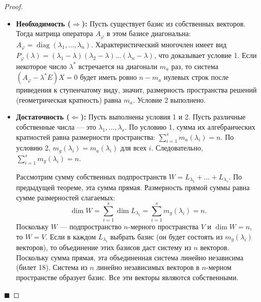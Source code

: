 \begin{proof}
\begin{itemize}
    \item \textbf{Необходимость ($\Rightarrow$):} Пусть существует базис из собственных векторов. Тогда матрица оператора $A_\varphi$ в этом базисе диагональна: $A_\varphi = \operatorname{diag}(\lambda_1, \dots, \lambda_n)$. 
    Характеристический многочлен имеет вид $P_\varphi(\lambda) = (\lambda_1 - \lambda)(\lambda_2 - \lambda)\dots(\lambda_n - \lambda)$, что доказывает условие 1. 
    Если некоторое число $\lambda^*$ встречается на диагонали $m_a$ раз, то система $(A_\varphi - \lambda^* E)X = 0$ будет иметь ровно $n - m_a$ нулевых строк после приведения к ступенчатому виду, значит, размерность пространства решений (геометрическая кратность) равна $m_a$. Условие 2 выполнено.
    
    \item \textbf{Достаточность ($\Leftarrow$):} Пусть выполнены условия 1 и 2. Пусть различные собственные числа --- это $\lambda_1, \dots, \lambda_s$. 
    По условию 1, сумма их алгебраических кратностей равна размерности пространства: $\sum_{i=1}^s m_a(\lambda_i) = n$.
    По условию 2, $m_g(\lambda_i) = m_a(\lambda_i)$ для всех $i$. Следовательно, $\sum_{i=1}^s m_g(\lambda_i) = n$.
    
    Рассмотрим сумму собственных подпространств $W = L_{\lambda_1} + \dots + L_{\lambda_s}$. По предыдущей теореме, эта сумма прямая. Размерность прямой суммы равна сумме размерностей слагаемых:
    \[
    \dim W = \sum_{i=1}^s \dim L_{\lambda_i} = \sum_{i=1}^s m_g(\lambda_i) = n.
    \]
    Поскольку $W$ --- подпространство $n$-мерного пространства $V$ и $\dim W = n$, то $W = V$. 
    Если в каждом $L_{\lambda_i}$ выбрать базис (он будет состоять из $m_g(\lambda_i)$ векторов), то объединение этих базисов даст систему из $n$ векторов. Поскольку сумма прямая, эта объединенная система линейно независима (билет 18). 
    Система из $n$ линейно независимых векторов в $n$-мерном пространстве образует базис. Все эти векторы являются собственными.
\end{itemize}
\hfill$\blacksquare$
\end{proof}
